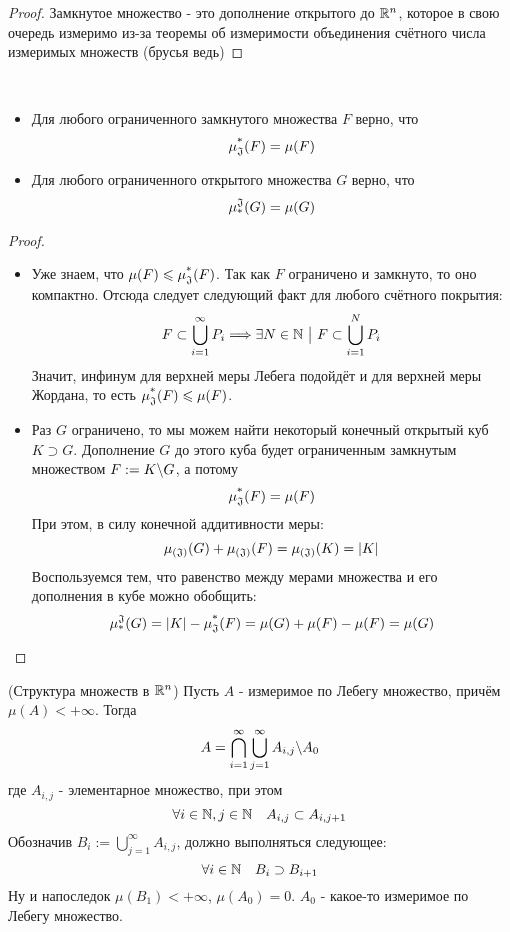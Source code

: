 \begin{proof}
	Замкнутое множество - это дополнение открытого до $\mathbb{R}^n$, которое в свою очередь измеримо из-за теоремы об измеримости объединения счётного числа измеримых множеств (брусья ведь)
\end{proof}

\begin{corollary}~
	\begin{itemize}
		\item Для любого ограниченного замкнутого множества $F$ верно, что
		\[
			\operatorname{\mu^*_\mathfrak{J}}(F) = \mu(F)
		\]
		
		\item Для любого ограниченного открытого множества $G$ верно, что
		\[
			\operatorname{\mu^\mathfrak{J}_*}(G) = \mu(G)
		\]
	\end{itemize}
\end{corollary}

\begin{proof}~
	\begin{itemize}
		\item Уже знаем, что $\mu(F) \leqslant \operatorname{\mu^*_\mathfrak{J}}(F)$. Так как $F$ ограничено и замкнуто, то оно компактно. Отсюда следует следующий факт для любого счётного покрытия:
		\[
			F \subset \bigcup_{i = 1}^\infty P_i \Longrightarrow \exists N \in \mathbb{N} \ \big|\  F \subset \bigcup_{i = 1}^N P_i
		\]
		Значит, инфинум для верхней меры Лебега подойдёт и для верхней меры Жордана, то есть $\operatorname{\mu^*_\mathfrak{J}}(F) \leqslant \mu(F)$.
		
		\item Раз $G$ ограничено, то мы можем найти некоторый конечный открытый куб $K \supset G$. Дополнение $G$ до этого куба будет ограниченным замкнутым множеством $F := K \backslash G$, а потому
		\[
			\operatorname{\mu^*_\mathfrak{J}}(F) = \mu(F)
		\]
		При этом, в силу конечной аддитивности меры:
		\[
			\operatorname{\mu_{(\mathfrak{J})}}(G) + \operatorname{\mu_{(\mathfrak{J})}}(F) = \operatorname{\mu_{(\mathfrak{J})}}(K) = |K|
		\]
		Воспользуемся тем, что равенство между мерами множества и его дополнения в кубе можно обобщить:
		\[
			\operatorname{\mu^\mathfrak{J}_*}(G) = |K| - \operatorname{\mu^*_\mathfrak{J}}(F) = \mu(G) + \mu(F) - \mu(F) = \mu(G)
		\]
		
	\end{itemize}
\end{proof}

\begin{theorem} (Структура множеств в $\mathbb{R}^n$)
	 Пусть $A$ - измеримое по Лебегу множество, причём $\mu(A) < +\infty$. Тогда
	 \[
	 	A = \bigcap_{i = 1}^\infty \bigcup_{j = 1}^\infty A_{i, j} \backslash A_0
	 \]
	 где $A_{i, j}$ - элементарное множество, при этом
	 \[
	 	\forall i \in \mathbb{N}, j \in \mathbb{N} \quad A_{i, j} \subset A_{i, j + 1}
	 \]
	 Обозначив $B_i := \bigcup_{j = 1}^\infty A_{i, j}$, должно выполняться следующее:
	 \[
	 	\forall i \in \mathbb{N} \quad B_i \supset B_{i + 1}
	 \]
	 Ну и напоследок $\mu(B_1) < +\infty$, $\mu(A_0) = 0$. $A_0$ - какое-то измеримое по Лебегу множество.
\end{theorem}

